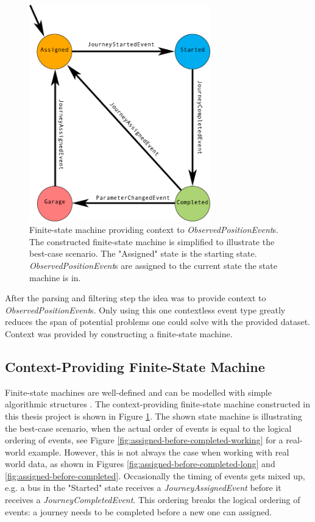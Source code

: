\begin{figure}[ht!]
    \centering
    \includegraphics[width=0.7\textwidth]{figures/context-state-machine}
    \caption{Finite-state machine providing context to \textit{ObservedPositionEvent}s. 
    The constructed finite-state machine is simplified to illustrate the best-case scenario.
    The "Assigned" state is the starting state.
    \textit{ObservedPositionEvent}s are assigned to the current state the state machine is in.
    }
    \label{fig:context-state-machine}
\end{figure}

After the parsing and filtering step the idea was to provide context to \textit{ObservedPositionEvent}s.
Only using this one contextless event type greatly reduces the span of potential problems one could solve with the provided dataset.
Context was provided by constructing a finite-state machine.

\subsection{Context-Providing Finite-State Machine}
Finite-state machines are well-defined  and can be modelled with simple algorithmic structures .
The context-providing finite-state machine constructed in this thesis project is shown in Figure \ref{fig:context-state-machine}.
The shown state machine is illustrating the best-case scenario, when the actual order of events is equal to the logical ordering of events, see Figure \ref{fig:assigned-before-completed-working} for a real-world example.
However, this is not always the case when working with real world data, as shown in Figures \ref{fig:assigned-before-completed-long} and \ref{fig:assigned-before-completed}.
Occasionally the timing of events gets mixed up, e.g. a bus in the "Started" state receives a \textit{JourneyAssignedEvent} before it receives a \textit{JourneyCompletedEvent}.
This ordering breaks the logical ordering of events: a journey needs to be completed before a new one can assigned.

